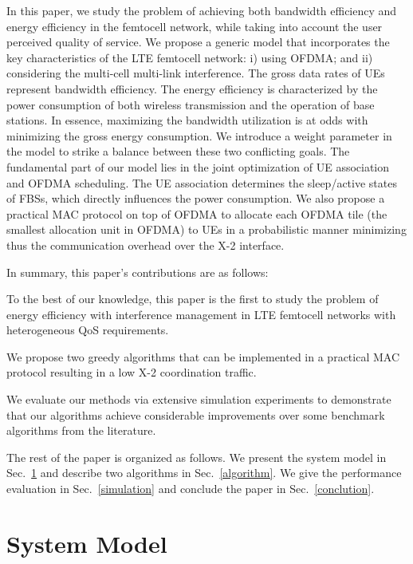 \documentclass[conference]{IEEEtran}
\newcommand{\myitem}{{\setlength{\parindent}{8pt}\footnotesize{ }}}
\begin{document}
In this paper, we study the problem of achieving both bandwidth efficiency and energy efficiency in the femtocell network, while taking into account the user perceived quality of service. We propose a generic model that incorporates the key characteristics of the LTE femtocell network: i) using OFDMA; and ii) considering the multi-cell multi-link interference. The gross data rates of UEs represent bandwidth efficiency. The energy efficiency is characterized by the power consumption of both wireless transmission and the operation of base stations. In essence, maximizing the bandwidth utilization is at odds with minimizing the gross energy consumption. We introduce a weight parameter in the model to strike a balance between these two conflicting goals. The fundamental part of our model lies in the joint optimization of UE association and OFDMA scheduling. The UE association determines the sleep/active states of FBSs, which directly influences the power consumption. We also propose a practical MAC protocol on top of OFDMA to allocate each OFDMA tile (the smallest allocation unit in OFDMA) to UEs in a probabilistic manner minimizing thus the communication overhead over the X-2 interface.





In summary, this paper's contributions are as follows:

\myitem To the best of our knowledge, this paper is the first to study the problem of energy efficiency  with interference management in LTE femtocell networks with heterogeneous QoS requirements.

\myitem We propose two greedy algorithms that can be implemented in a practical MAC protocol resulting in a low X-2 coordination traffic.

\myitem We evaluate our methods via extensive simulation experiments to demonstrate that our algorithms achieve considerable improvements over some benchmark algorithms from the literature.



The rest of the paper is organized as follows. We present the system model in Sec.~\ref{model} and describe two algorithms in Sec.~\ref{algorithm}. We give the performance evaluation in Sec.~\ref{simulation} and conclude the paper in Sec.~\ref{conclution}.




\section{System Model}\label{model}
\end{document}
